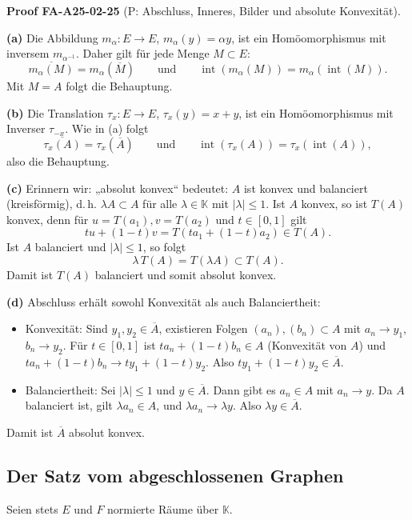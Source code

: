 \documentclass[10pt, letterpaper]{article}
\newcommand{\CustomHeading}[3]{%
  \par\medskip\noindent%
  \textbf{#1 #2} \textnormal{(#3)}.\enskip%
}
\newenvironment{PROOF}[2]{\begin{unitbox}\CustomHeading{Proof}{#1}{#2}}{\end{unitbox}}
\begin{document}
\begin{PROOF}{FA-A25-02-25}{P: Abschluss, Inneres, Bilder und absolute Konvexität}
\textbf{(a)} Die Abbildung $m_\alpha:E\to E$, $m_\alpha(y)=\alpha y$, ist ein Homöomorphismus mit inversem $m_{\alpha^{-1}}$.
Daher gilt für jede Menge $M\subset E$:
\[
\overline{m_\alpha(M)}=m_\alpha(\overline{M})
\qquad\text{und}\qquad
\operatorname{int}(m_\alpha(M))=m_\alpha(\operatorname{int}(M)).
\]
Mit $M=A$ folgt die Behauptung.

\medskip
\textbf{(b)} Die Translation $\tau_x:E\to E$, $\tau_x(y)=x+y$, ist ein Homöomorphismus mit Inverser $\tau_{-x}$. Wie in (a) folgt
\[
\overline{\tau_x(A)}=\tau_x(\overline{A})
\qquad\text{und}\qquad
\operatorname{int}(\tau_x(A))=\tau_x(\operatorname{int}(A)),
\]
also die Behauptung.

\medskip
\textbf{(c)} Erinnern wir: „absolut konvex“ bedeutet: $A$ ist konvex und balanciert (kreisförmig), d.\,h.
$\lambda A\subset A$ für alle $\lambda\in\mathbb{K}$ mit $|\lambda|\le 1$.
Ist $A$ konvex, so ist $T(A)$ konvex, denn für $u=T(a_1), v=T(a_2)$ und $t\in[0,1]$ gilt
\[
t u+(1-t)v=T(ta_1+(1-t)a_2)\in T(A).
\]
Ist $A$ balanciert und $|\lambda|\le 1$, so folgt
\[
\lambda\,T(A)=T(\lambda A)\subset T(A).
\]
Damit ist $T(A)$ balanciert und somit absolut konvex.

\medskip
\textbf{(d)} Abschluss erhält sowohl Konvexität als auch Balanciertheit:
\begin{itemize}\itemsep0.15em
\item Konvexität: Sind $y_1,y_2\in\overline{A}$, existieren Folgen $(a_n),(b_n)\subset A$ mit $a_n\to y_1$, $b_n\to y_2$. Für $t\in[0,1]$ ist $t a_n+(1-t)b_n\in A$ (Konvexität von $A$) und $t a_n+(1-t)b_n\to t y_1+(1-t)y_2$. Also $t y_1+(1-t)y_2\in\overline{A}$.
\item Balanciertheit: Sei $|\lambda|\le 1$ und $y\in\overline{A}$. Dann gibt es $a_n\in A$ mit $a_n\to y$. Da $A$ balanciert ist, gilt $\lambda a_n\in A$, und $\lambda a_n\to \lambda y$. Also $\lambda y\in\overline{A}$.
\end{itemize}
Damit ist $\overline{A}$ absolut konvex.
\end{PROOF}



\pagebreak


\subsection{Der Satz vom abgeschlossenen Graphen}


Seien stets $E$ und $F$ normierte Räume über $\mathbb{K}$.
\end{document}
